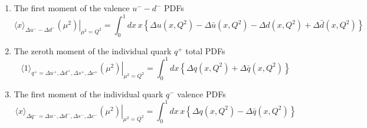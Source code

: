 \begin{itemize}
\begin{enumerate}
\item The first moment of the valence $u^--d^-$ PDFs
\begin{equation}
\left.\langle x\rangle_{\Delta u^--\Delta d^-}(\mu^2)\right|_{\mu^2=Q^2}
=
\int_0^1 dx\, x\left\{\Delta u(x,Q^2)-\Delta\bar{u}(x,Q^2)-\Delta d(x,Q^2)+\Delta \bar{d}(x,Q^2)\right\}
\label{eq:polfmumdval}  
\end{equation}

\item The zeroth moment of the individual quark $q^+$ total PDFs
\begin{equation}
\left.\langle 1\rangle_{q^+=\Delta u^+,\Delta d^+,\Delta s^+,\Delta c^+}(\mu^2)\right|_{\mu^2=Q^2}
=
\int_0^1 dx \left\{\Delta q(x,Q^2)+\Delta\bar{q}(x,Q^2)\right\}
\label{eq:polzmiqtot}
\end{equation}

\item The first moment of the individual quark $q^-$ valence PDFs
\begin{equation}
\left.\langle x\rangle_{\Delta q^-=\Delta u^-,\Delta d^-,\Delta s^-,\Delta c^-}(\mu^2)\right|_{\mu^2=Q^2}
=
\int_0^1 dx\, x\left\{\Delta q(x,Q^2)-\Delta\bar{q}(x,Q^2)\right\}
\label{eq:polfmiqval}
\end{equation}

\end{enumerate}

\end{itemize}













